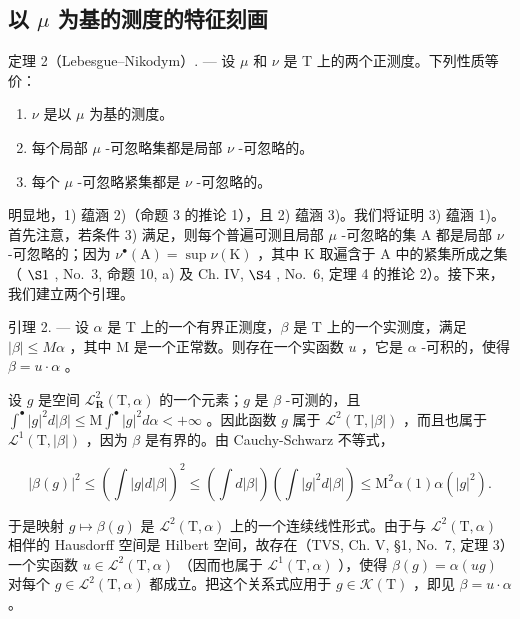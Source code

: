 \subsection{\texorpdfstring{以 \(\mu\) 为基的测度的特征刻画}{以 mu 为基的测度的特征刻画}}

定理 2（Lebesgue--Nikodym）. --- 设 \(\mu\) 和 \(\nu\) 是 T 上的两个正测度。下列性质等价：

\begin{enumerate}
\def\labelenumi{\arabic{enumi})}
\item
  \(\nu\) 是以 \(\mu\) 为基的测度。
\item
  每个局部 \(\mu\) -可忽略集都是局部 \(\nu\) -可忽略的。
\item
  每个 \(\mu\) -可忽略紧集都是 \(\nu\) -可忽略的。
\end{enumerate}

明显地，1) 蕴涵 2)（命题 3 的推论 1），且 2) 蕴涵 3)。我们将证明 3) 蕴涵 1)。首先注意，若条件 3) 满足，则每个普遍可测且局部 \(\mu\) -可忽略的集 A 都是局部 \(\nu\) -可忽略的；因为 \(\nu^{\bullet}(\mathrm{A}) = \sup \nu(\mathrm{K})\) ，其中 K 取遍含于 A 中的紧集所成之集（ \(\S 1\) , No.~3, 命题 10, a) 及 Ch. IV, \(\S 4\) , No.~6, 定理 4 的推论 2）。接下来，我们建立两个引理。

引理 2. --- 设 \(\alpha\) 是 T 上的一个有界正测度，\(\beta\) 是 T 上的一个实测度，满足 \(|\beta| \leqslant M\alpha\) ，其中 M 是一个正常数。则存在一个实函数 \(u\) ，它是 \(\alpha\) -可积的，使得 \(\beta = u \cdot \alpha\) 。

设 \(g\) 是空间 \(\mathcal{L}_{\mathbf{R}}^{2}(\mathrm{T},\alpha)\) 的一个元素；\(g\) 是 \(\beta\) -可测的，且 \(\int^{\bullet}|g|^2 d|\beta| \leqslant \mathrm{M}\int^{\bullet}|g|^2 d\alpha < +\infty\) 。因此函数 \(g\) 属于 \(\mathcal{L}^2 (\mathrm{T},|\beta|)\) ，而且也属于 \(\mathcal{L}^1 (\mathrm{T},|\beta|)\) ，因为 \(\beta\) 是有界的。由 Cauchy-Schwarz 不等式，

\[
| \beta (g) | ^ {2} \leqslant \left(\int | g | d | \beta |\right) ^ {2} \leqslant \left(\int d | \beta |\right) \left(\int | g | ^ {2} d | \beta |\right) \leqslant \mathrm{M} ^ {2} \alpha (1) \alpha (| g | ^ {2}).
\]

于是映射 \(g \mapsto \beta(g)\) 是 \(\mathcal{L}^2(\mathrm{T},\alpha)\) 上的一个连续线性形式。由于与 \(\mathcal{L}^2(\mathrm{T},\alpha)\) 相伴的 Hausdorff 空间是 Hilbert 空间，故存在（TVS, Ch. V, §1, No.~7, 定理 3）一个实函数 \(u \in \mathcal{L}^2(\mathrm{T},\alpha)\) （因而也属于 \(\mathcal{L}^1(\mathrm{T},\alpha)\) ），使得 \(\beta(g) = \alpha(ug)\) 对每个 \(g \in \mathcal{L}^2(\mathrm{T},\alpha)\) 都成立。把这个关系式应用于 \(g \in \mathcal{K}(\mathrm{T})\) ，即见 \(\beta = u\cdot \alpha\) 。

